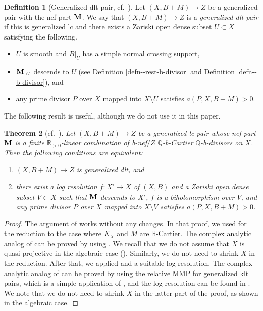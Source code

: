 \documentclass[12pt]{amsart}
\newtheorem{thm}{Theorem}[section]
\theoremstyle{definition}
\newtheorem{defn}[thm]{Definition}
\begin{document}
\begin{defn}[Generalized dlt pair, {cf.~\cite[2.13]{birkar-compl}}]\label{defn--gen-dlt}
Let $(X,B+M) \to Z$ be a generalized pair with the nef part $\boldsymbol{\rm M}$. 
We say that $(X,B+M) \to Z$ is a {\em generalized dlt pair} if this is generalized lc and there exists a Zariski open dense subset $U \subset X$ satisfying the following.
\begin{itemize}
\item
$U$ is smooth and $B|_{U}$ has a simple normal crossing support, 
\item
$\boldsymbol{\rm M}|_{U}$ descends to $U$ (see Definition \ref{defn--rest-b-divisor} and Definition \ref{defn--b-divisor}), and
\item
any prime divisor $P$ over $X$ mapped into $X \setminus U$ satisfies $a(P,X,B+M)>0$.  
\end{itemize}
\end{defn}

The following result is useful, although we do not use it in this paper.

\begin{thm}[{cf.~\cite[Theorem 6.1]{has-iitakafibration}}] Let $(X,B+M) \to Z$ be a generalized lc pair whose nef part $\boldsymbol{\rm M}$ is a finite $\mathbb{R}_{>0}$-linear combination of b-nef$/Z$ $\mathbb{Q}$-b-Cartier $\mathbb{Q}$-b-divisors on $X$. Then the following conditions are equivalent: \begin{enumerate} \item$(X,B+M) \to Z$ is generalized dlt, and \item there exist a log resolution $f \colon X' \to X$ of $(X,B)$ and a Zariski open dense subset $V \subset X$ such that $\boldsymbol{\rm M}$ descends to $X'$, $f$ is a biholomorphism over $V$, and any prime divisor $P$ over $X$ mapped into $X \setminus V$ satisfies $a(P,X,B+M)>0$.  \end{enumerate} \end{thm}


\begin{proof} The argument of \cite[Proof of Theorem 6.1]{has-iitakafibration} works without any changes. In that proof, we used \cite[Theorem 1.2]{has-class} for the reduction to the case where $K_{X}$ and $M$ are $\mathbb{R}$-Cartier. The complex analytic analog of \cite[Theorem 1.2]{has-class} can be proved by using \cite[Theorem 1.3]{eh-analytic-mmp}. We recall that we do not assume that $X$ is quasi-projective in the algebraic case (\cite[Theorem 6.1]{has-iitakafibration}). Similarly, we do not need to shrink $X$ in the reduction. After that, we applied \cite[Lemma 6.2]{has-iitakafibration} and a suitable log resolution. The complex analytic analog of \cite[Lemma 6.2]{has-iitakafibration} can be proved by using the relative MMP for generalized klt pairs, which is a simple application of \cite{fujino-analytic-bchm}, and the log resolution can be found in \cite[Section 13]{resolution-1}. We note that we do not need to shrink $X$ in the latter part of the proof, as shown in the algebraic case. \end{proof}
\end{document}
